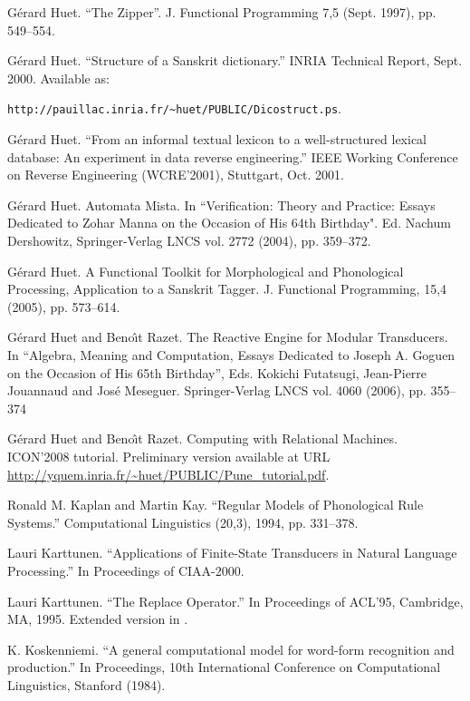 \begin{thebibliography}{10}
 G\'erard Huet. ``The Zipper''. J. Functional Programming 7,5 
(Sept. 1997), pp. 549--554.

G\'erard Huet.
``Structure of a Sanskrit dictionary.''
INRIA Technical Report, Sept. 2000.
Available as: \raggedright
\verb!http://pauillac.inria.fr/~huet/PUBLIC/Dicostruct.ps!.

G\'erard Huet.
``From an informal textual lexicon to a well-structured lexical database:
An experiment in data reverse engineering.''
IEEE Working Conference on Reverse Engineering (WCRE'2001), 
Stuttgart, Oct. 2001.

G\'erard Huet. Automata Mista. In ``Verification: Theory and Practice: Essays Dedicated
to {Zohar} {Manna} on the Occasion of His 64th Birthday". Ed. Nachum Dershowitz,
Springer-Verlag LNCS vol. 2772 (2004), pp. 359--372.

G\'erard Huet. A Functional Toolkit for Morphological
and Phonological Processing, Application to a {Sanskrit} Tagger.
J. Functional Programming, 15,4 (2005), pp. 573--614. 

G\'erard Huet and Beno{\^\i}t Razet. The Reactive Engine for Modular Transducers.
In ``Algebra, Meaning and Computation, Essays Dedicated to 
Joseph A. Goguen on the Occasion of His 65th Birthday'', Eds.
Kokichi Futatsugi, Jean-Pierre Jouannaud and Jos\'e Meseguer.
Springer-Verlag LNCS vol. 4060 (2006), pp. 355--374

G\'erard Huet and Beno{\^\i}t Razet. Computing with Relational Machines.
ICON'2008 tutorial. Preliminary version available at URL
\url{http://yquem.inria.fr/~huet/PUBLIC/Pune_tutorial.pdf}.

 Ronald M. Kaplan and Martin Kay. ``Regular Models of
Phonological Rule Systems.'' Computational Linguistics (20,3), 1994,
pp. 331--378. 

 Lauri Karttunen. ``Applications of Finite-State 
Transducers in Natural Language Processing.'' 
In Proceedings of CIAA-2000.

 Lauri Karttunen. ``The Replace Operator.'' 
In Proceedings of ACL'95, Cambridge, MA, 1995. Extended version
in \cite{rs2}.

 K. Koskenniemi. ``A general computational model for word-form
recognition and production.'' In Proceedings, 10th International Conference 
on Computational Linguistics, Stanford (1984). 


\end{thebibliography}
